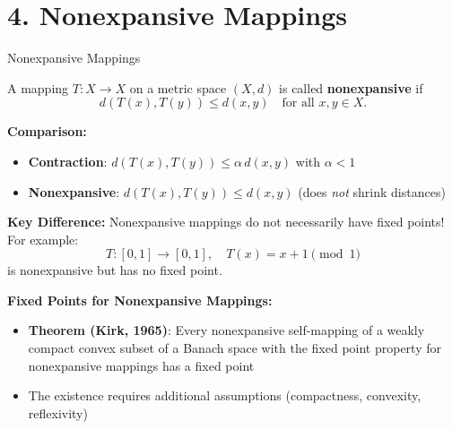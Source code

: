 \documentclass[aspectratio=169,10pt]{beamer}
\begin{document}
\section{4. Nonexpansive Mappings}

\begin{frame}{Nonexpansive Mappings}
    \begin{definition}
        A mapping $T: X \to X$ on a metric space $(X, d)$ is called \textbf{nonexpansive} if
        \[
            d(T(x), T(y)) \leq d(x, y) \quad \text{for all } x, y \in X.
        \]
    \end{definition}

    \vspace{0.4cm}
    \textbf{Comparison:}
    \begin{itemize}
        \item \textbf{Contraction}: $d(T(x), T(y)) \leq \alpha \, d(x,y)$ with $\alpha < 1$
        \item \textbf{Nonexpansive}: $d(T(x), T(y)) \leq d(x,y)$ (does \textit{not} shrink distances)
    \end{itemize}

    \vspace{0.4cm}
    \textbf{Key Difference:} Nonexpansive mappings do not necessarily have fixed points! For example:
    \[
        T: [0,1] \to [0,1], \quad T(x) = x + 1 \pmod{1}
    \]
    is nonexpansive but has no fixed point.

    \vspace{0.3cm}
    \textbf{Fixed Points for Nonexpansive Mappings:}
    \begin{itemize}
        \item \textbf{Theorem (Kirk, 1965)}: Every nonexpansive self-mapping of a weakly compact convex subset of a Banach space with the fixed point property for nonexpansive mappings has a fixed point
        \item The existence requires additional assumptions (compactness, convexity, reflexivity)
    \end{itemize}
\end{frame}
\end{document}
